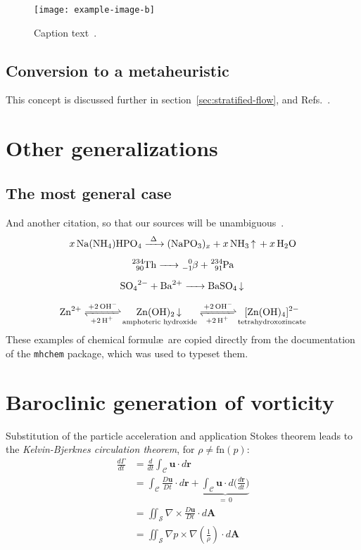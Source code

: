 \begin{figure}[t]
\centering\texttt{[image: example-image-b]} 
\caption{Caption text\label{example-image-b}~\cite{GSL}.}
\end{figure}


\subsection{Conversion to a metaheuristic}

\lipsum[11-12] This concept is discussed further in section~\ref{sec:stratified-flow}, and Refs.~\cite{euler1740,fourier1822}.



\section{Other generalizations}

\subsection{The most general case}

\lipsum[7] And another citation, so that our sources will be unambiguous~\cite{montijano2014}.
\begin{gather}
\ce{x Na(NH4)HPO4 ->[\Delta] (NaPO3)_x + x NH3 ^ + x H2O} \\[0.5em]
\ce{^234_90Th -> ^0_-1$\beta${} + ^234_91Pa} \\[0.5em]
\ce{SO4^2- + Ba^2+ -> BaSO4 v} \\[0.5em]
\ce{Zn^2+
<=>[+ 2OH-][+ 2H+]
$\underset{\text{amphoteric hydroxide}}{\ce{Zn(OH)2 v}}$
<=>[+ 2OH-][+ 2H+]
$\underset{\text{tetrahydroxozincate}}{\ce{[Zn(OH)4]^2-}}$
}
\end{gather}
These examples of chemical formul\ae\ are copied directly from the documentation of the \texttt{mhchem} package, which was used to typeset them.

\section{Baroclinic generation of vorticity\label{sec:stratified-flow}}

Substitution of the particle acceleration and application Stokes theorem leads to the \textit{Kelvin-Bjerknes circulation theorem}, for
$\rho \neq \text{fn}(p)$:
\begin{align}
\frac{d\Gamma}{dt} &{}= \frac{d}{dt} \int_{\mathcal{C}} \mathbf{u} \cdot d\mathbf{r}\\
				   &{}= \int_{\mathcal{C}} \frac{D\mathbf{u}}{Dt} \cdot d\mathbf{r} + \underbrace{\int_{\mathcal{C}} \mathbf{u}\cdot d\biggl( \frac{d\mathbf{r}}{dt}\Biggr)}_{=\, 0} \\[-2pt]
                   &{}= \iint_{\mathcal{S}} \nabla \times \frac{D\mathbf{u}}{Dt}  \cdot d\mathbf{A}\\
                   &{}= \iint_{\mathcal{S}}  \nabla p \times \nabla \left( \frac{1}{\rho}\right) \cdot d\mathbf{A}
\end{align}

